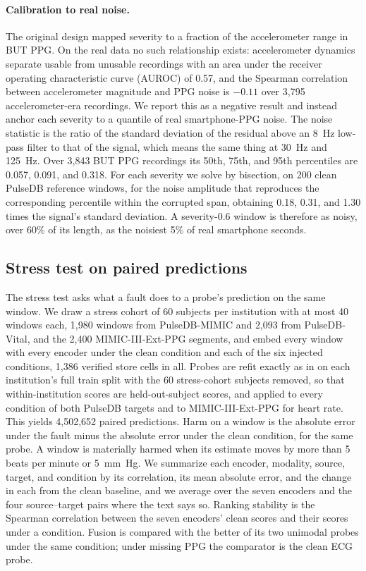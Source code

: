 \documentclass[pmlr,twocolumn,10pt]{jmlr}
\begin{document}
\paragraph{Calibration to real noise.}
The original design mapped severity to a fraction of the accelerometer range in BUT PPG. On the real data no such relationship exists: accelerometer dynamics separate usable from unusable recordings with an area under the receiver operating characteristic curve (AUROC) of 0.57, and the Spearman correlation between accelerometer magnitude and PPG noise is $-0.11$ over 3,795 accelerometer-era recordings. We report this as a negative result and instead anchor each severity to a quantile of real smartphone-PPG noise. The noise statistic is the ratio of the standard deviation of the residual above an 8~\si{\hertz} low-pass filter to that of the signal, which means the same thing at \SI{30}{\hertz} and \SI{125}{\hertz}. Over 3,843 BUT PPG recordings its 50th, 75th, and 95th percentiles are 0.057, 0.091, and 0.318. For each severity we solve by bisection, on 200 clean PulseDB reference windows, for the noise amplitude that reproduces the corresponding percentile within the corrupted span, obtaining 0.18, 0.31, and 1.30 times the signal's standard deviation. A severity-0.6 window is therefore as noisy, over 60\% of its length, as the noisiest 5\% of real smartphone seconds.

\subsection{Stress test on paired predictions}
\label{sec:stress}

The stress test asks what a fault does to a probe's prediction on the same window. We draw a stress cohort of 60 subjects per institution with at most 40 windows each, 1,980 windows from PulseDB-MIMIC and 2,093 from PulseDB-Vital, and the 2,400 MIMIC-III-Ext-PPG segments, and embed every window with every encoder under the clean condition and each of the six injected conditions, 1,386 verified store cells in all. Probes are refit exactly as in  on each institution's full train split with the 60 stress-cohort subjects removed, so that within-institution scores are held-out-subject scores, and applied to every condition of both PulseDB targets and to MIMIC-III-Ext-PPG for heart rate. This yields 4,502,652 paired predictions. Harm on a window is the absolute error under the fault minus the absolute error under the clean condition, for the same probe. A window is materially harmed when its estimate moves by more than 5 beats per minute or 5~\si{\milli\meter Hg}. We summarize each encoder, modality, source, target, and condition by its correlation, its mean absolute error, and the change in each from the clean baseline, and we average over the seven encoders and the four source--target pairs where the text says so. Ranking stability is the Spearman correlation between the seven encoders' clean scores and their scores under a condition. Fusion is compared with the better of its two unimodal probes under the same condition; under missing PPG the comparator is the clean ECG probe.
\end{document}
